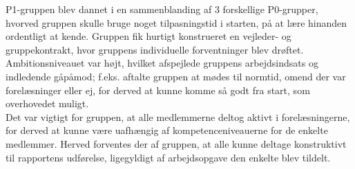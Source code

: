 P1-gruppen blev dannet i en sammenblanding af 3 forskellige P0-grupper, hvorved gruppen skulle bruge noget tilpasningstid i starten, på at lære hinanden ordentligt at kende. Gruppen fik hurtigt konstrueret en vejleder- og gruppekontrakt, hvor gruppens individuelle forventninger blev drøftet. Ambitionsniveauet var højt, hvilket afspejlede gruppens arbejdsindsats og indledende gåpåmod; f.eks. aftalte gruppen at mødes til normtid, omend der var forelæsninger eller ej, for derved at kunne komme så godt fra start, som overhovedet muligt. \\

Det var vigtigt for gruppen, at alle medlemmerne deltog aktivt i forelæsningerne, for derved at kunne være uafhængig af kompetenceniveauerne for de enkelte medlemmer. Herved forventes der af gruppen, at alle kunne deltage konstruktivt til rapportens udførelse, ligegyldigt af arbejdsopgave den enkelte blev tildelt.

